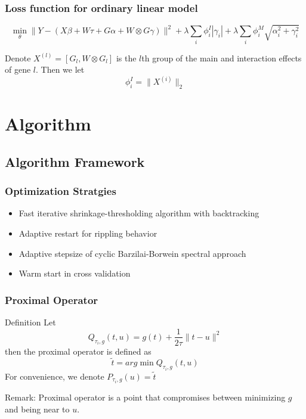 \documentclass{beamer}
\begin{document}
\begin{frame}
\frametitle{Loss function for ordinary linear model}

$$\min_{\theta} \parallel Y-(X\beta + W\tau + G\alpha + W\otimes G \gamma) \parallel^2 + \lambda \sum_i \phi_i^I |\gamma_i| + \lambda \sum_i \phi_i^M \sqrt{\alpha_i^2 + \gamma_i^2}$$

Denote $X^{(l)}=[G_l,W\otimes G_l]$ is the $l$th group of the main and interaction effects of gene $l$.
Then we let $$\phi_i^I=\parallel X^{(i)}\parallel_2$$
\end{frame}


\section{Algorithm}

\subsection{Algorithm Framework}

\begin{frame}
\frametitle{Optimization Stratgies}
\begin{itemize}
\item Fast iterative shrinkage-thresholding algorithm with backtracking\cite{fasta}
\item Adaptive restart for rippling behavior \cite{restart}
\item Adaptive stepsize of cyclic Barzilai-Borwein spectral approach\cite{step}
\item Warm start in cross validation
\end{itemize}

\end{frame}


\begin{frame}
\frametitle{Proximal Operator}
\begin{block}{Definition}
Let $$Q_{\tau_i,g}(t,u)=g(t)+\frac{1}{2\tau}\parallel t-u\parallel^2$$
then the proximal operator is defined as $$\tilde{t}=arg\min Q_{\tau_i,g}(t,u)$$
For convenience, we denote $P_{\tau_i,g}(u)=\tilde{t}$
\end{block}
Remark: Proximal operator is a point that compromises between minimizing $g$ and being near to $u$. 
\end{frame}
\end{document}

